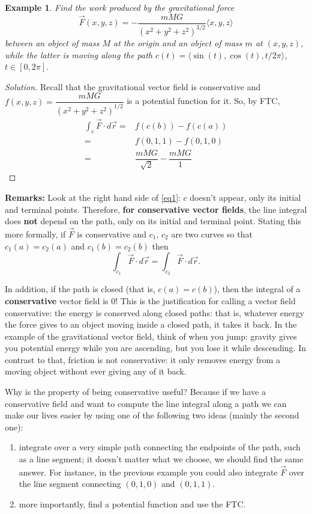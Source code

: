 \documentclass[12pt]{article}
\newcommand{\vr}{\vec{r}{}}
\newcommand{\vF}{\vec{F}}
\renewcommand{\lg}{\langle}
\newcommand{\rg}{\rangle}
\newenvironment{solution}
  {\begin{proof}[Solution]}
  {\end{proof}
  
  }
\newtheorem{example}{Example}
\begin{document}
\begin{example} Find the work produced by the gravitational force $$\vF(x,y,z)=-\frac{mMG}{(x^2+y^2+z^2)^{3/2}}\lg x,y,z\rg$$ between an object of mass $M$ at the origin and an object of mass $m$ at $(x,y,z)$, while the latter is moving along the path $c(t)=\lg \sin(t),\cos(t),t/2\pi\rg$, $t\in[0,2\pi]$.
\end{example}
\begin{solution}
Recall that the gravitational vector field is conservative and $f(x,y,z)=\dfrac{mMG}{(x^2+y^2+z^2)^{1/2}}$ is a potential function for it. So, by FTC, \begin{align*}\int_c \vF\cdot d\vr =&f(c(b))-f(c(a))\\
=& f(0,1,1)-f(0,1,0)\\
=&\dfrac{mMG}{\sqrt{2}}-\dfrac{mMG}{1}
\end{align*}
\end{solution}


\textbf{Remarks:} Look at the right hand side of \eqref{eq1}: $c$ doesn't appear, only its initial and terminal points. Therefore, \textbf{for conservative vector fields}, the line integral does \textbf{not } depend on the path, only on its initial and terminal point. Stating this more formally, if $\vF$ is conservative and $c_1$, $c_2 $ are two curves so that $c_1(a)=c_2(a)$ and $c_1(b)=c_2(b)$ then $$\int_{c_1}\vF\cdot d\vr =\int_{c_2}\vF\cdot d\vr.$$

In addition, if the path is closed (that is, $c(a)=c(b)$), then the integral of a \textbf{conservative} vector field is 0! This is the justification for calling a vector field conservative: the energy is conserved along closed paths: that is, whatever energy the force gives to an object moving inside a closed path, it takes it back. In the example of the gravitational vector field, think of when you jump: gravity gives you potential energy while you are ascending, but you lose it while descending. In contrast to that, friction is not conservative: it only removes energy from a moving object without ever giving any of it back.


\vspace{.2 in}
Why is the property of being conservative useful? Because if we have a conservative field and want to compute the line integral along a path we can make our lives easier by using one of the following two ideas (mainly the second one):
\begin{enumerate}
\item integrate over a very simple path connecting the endpoints of the path, such as a line segment; it doesn't matter what we choose, we should find the same answer. For instance, in the previous example you could also integrate $\vF$ over the line segment connecting $(0,1,0)$ and $(0,1,1)$.
\item more importantly, find a potential function and use the FTC.
\end{enumerate}
\end{document}
